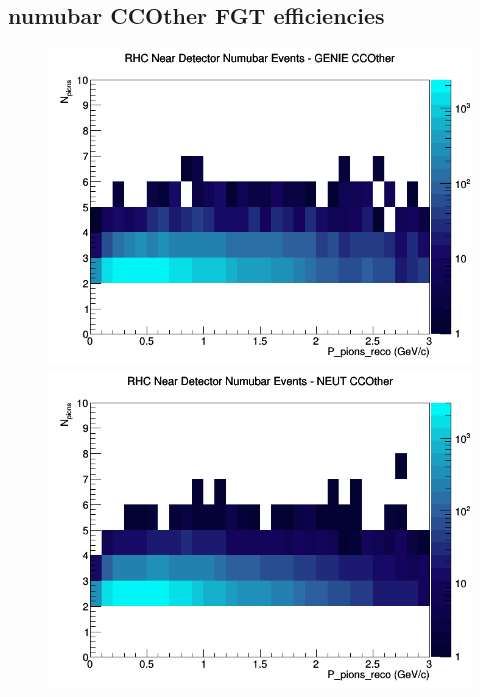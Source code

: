 \documentclass[12pt]{article}
\begin{document}
\subsection{numubar CCOther FGT efficiencies}
\begin{figure}[h]
\includegraphics[width=\linewidth]{eff_N_P/FGT/pions/CCOther_RHC_ND_numubar_N_P_GENIE.png}
\endminipage
{}
\includegraphics[width=\linewidth]{eff_N_P/FGT/pions/CCOther_RHC_ND_numubar_N_P_NEUT.png}
\endminipage
{}

\end{figure}
\end{document}
